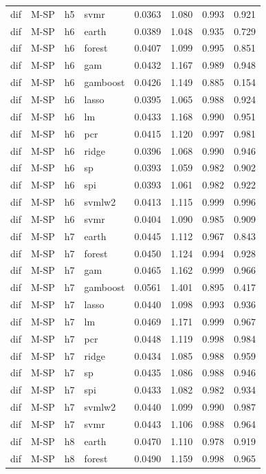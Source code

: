 \begin{ThreePartTable}
\begin{longtable}[t]{llclcccc}
dif & M-SP & h5 & svmr & 0.0363 & 1.080 & 0.993 & 0.921\\
\addlinespace
dif & M-SP & h6 & earth & 0.0389 & 1.048 & 0.935 & 0.729\\
dif & M-SP & h6 & forest & 0.0407 & 1.099 & 0.995 & 0.851\\
dif & M-SP & h6 & gam & 0.0432 & 1.167 & 0.989 & 0.948\\
dif & M-SP & h6 & gamboost & 0.0426 & 1.149 & 0.885 & 0.154\\
dif & M-SP & h6 & lasso & 0.0395 & 1.065 & 0.988 & 0.924\\
dif & M-SP & h6 & lm & 0.0433 & 1.168 & 0.990 & 0.951\\
dif & M-SP & h6 & pcr & 0.0415 & 1.120 & 0.997 & 0.981\\
dif & M-SP & h6 & ridge & 0.0396 & 1.068 & 0.990 & 0.946\\
dif & M-SP & h6 & sp & 0.0393 & 1.059 & 0.982 & 0.902\\
dif & M-SP & h6 & spi & 0.0393 & 1.061 & 0.982 & 0.922\\
dif & M-SP & h6 & svmlw2 & 0.0413 & 1.115 & 0.999 & 0.996\\
dif & M-SP & h6 & svmr & 0.0404 & 1.090 & 0.985 & 0.909\\
\addlinespace
dif & M-SP & h7 & earth & 0.0445 & 1.112 & 0.967 & 0.843\\
dif & M-SP & h7 & forest & 0.0450 & 1.124 & 0.994 & 0.928\\
dif & M-SP & h7 & gam & 0.0465 & 1.162 & 0.999 & 0.966\\
dif & M-SP & h7 & gamboost & 0.0561 & 1.401 & 0.895 & 0.417\\
dif & M-SP & h7 & lasso & 0.0440 & 1.098 & 0.993 & 0.936\\
dif & M-SP & h7 & lm & 0.0469 & 1.171 & 0.999 & 0.967\\
dif & M-SP & h7 & pcr & 0.0448 & 1.119 & 0.998 & 0.984\\
dif & M-SP & h7 & ridge & 0.0434 & 1.085 & 0.988 & 0.959\\
dif & M-SP & h7 & sp & 0.0435 & 1.086 & 0.988 & 0.946\\
dif & M-SP & h7 & spi & 0.0433 & 1.082 & 0.982 & 0.934\\
dif & M-SP & h7 & svmlw2 & 0.0440 & 1.099 & 0.990 & 0.987\\
dif & M-SP & h7 & svmr & 0.0443 & 1.106 & 0.988 & 0.964\\
\addlinespace
dif & M-SP & h8 & earth & 0.0470 & 1.110 & 0.978 & 0.919\\
dif & M-SP & h8 & forest & 0.0490 & 1.159 & 0.998 & 0.965\\

\end{longtable}
\end{ThreePartTable}
